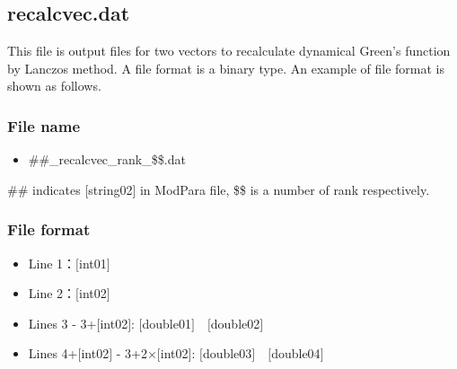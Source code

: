 \newpage
\subsection{{recalcvec.dat}}
\label{Subsec:restart}
This file is output files for two vectors to recalculate dynamical Green's function by Lanczos method. 
A file format is a binary type. 
An example of file format is shown as follows.

\subsubsection{File name}
\begin{itemize}
   \item{\#\#\_recalcvec\_rank\_\$\$.dat}
\end{itemize}
\#\# indicates [string02] in ModPara file, \$\$ is a number of rank respectively. 

\subsubsection{File format}
 \begin{itemize}
   \item  Line 1：$[$int01$]$
   \item  Line 2：$[$int02$]$
   \item  Lines 3 - 3+$[$int02$]$: $[$double01$]$~~$[$double02$]$
   \item  Lines 4+$[$int02$]$ - 3+2$\times [$int02$]$: $[$double03$]$~~$[$double04$]$

  \end{itemize}
